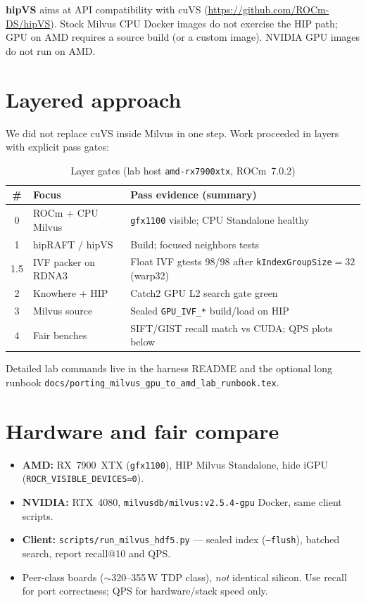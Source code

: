 \documentclass[11pt,a4paper]{article}
\begin{document}
\textbf{hipVS} aims at API compatibility with cuVS
(\url{https://github.com/ROCm-DS/hipVS}).
Stock Milvus CPU Docker images do not exercise the HIP path; GPU on AMD requires
a source build (or a custom image). NVIDIA GPU images do not run on AMD.

\section{Layered approach}
\label{sec:layers}

We did not replace cuVS inside Milvus in one step. Work proceeded in layers with
explicit pass gates:

\begin{table}[H]
\centering
\caption{Layer gates (lab host \texttt{amd-rx7900xtx}, ROCm~7.0.2)}
\label{tab:layers}
\begin{tabular}{@{}clp{}@{}}
\toprule
\textbf{\#} & \textbf{Focus} & \textbf{Pass evidence (summary)} \\
\midrule
0 & ROCm + CPU Milvus & \texttt{gfx1100} visible; CPU Standalone healthy \\
1 & hipRAFT / hipVS & Build; focused neighbors tests \\
1.5 & IVF packer on RDNA3 & Float IVF gtests 98/98 after
      \texttt{kIndexGroupSize}${=}32$ (warp32) \\
2 & Knowhere + HIP & Catch2 GPU L2 search gate green \\
3 & Milvus source & Sealed \texttt{GPU\_IVF\_*} build/load on HIP \\
4 & Fair benches & SIFT/GIST recall match vs CUDA; QPS plots below \\
\bottomrule
\end{tabular}
\end{table}

\noindent Detailed lab commands live in the harness README and the optional long
runbook \texttt{docs/porting\_milvus\_gpu\_to\_amd\_lab\_runbook.tex}.

\section{Hardware and fair compare}
\label{sec:fair}

\begin{itemize}[leftmargin=*]
  \item \textbf{AMD:} RX~7900~XTX (\texttt{gfx1100}), HIP Milvus Standalone,
        hide iGPU (\texttt{ROCR\_VISIBLE\_DEVICES=0}).
  \item \textbf{NVIDIA:} RTX~4080, \texttt{milvusdb/milvus:v2.5.4-gpu} Docker,
        same client scripts.
  \item \textbf{Client:} \texttt{scripts/run\_milvus\_hdf5.py} --- sealed index
        (\texttt{--flush}), batched search, report recall@10 and QPS.
  \item Peer-class boards ($\sim$320--355\,W TDP class), \emph{not} identical silicon.
        Use recall for port correctness; QPS for hardware/stack speed only.
\end{itemize}
\end{document}
